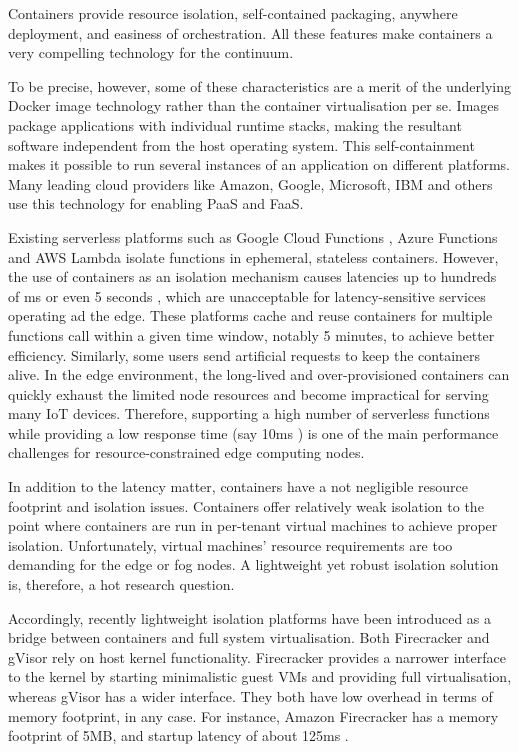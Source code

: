 Containers provide resource isolation, self-contained packaging, anywhere deployment, and easiness of orchestration. All these features make containers a very compelling technology for the continuum.

To be precise, however, some of these characteristics are a merit of the underlying Docker image technology \cite{docker-image} rather than the container virtualisation per se. Images package applications with individual runtime stacks, making the resultant software independent from the host operating system. This self-containment makes it possible to run several instances of an application on different platforms. Many leading cloud providers like Amazon, Google, Microsoft, IBM and others use this technology for enabling PaaS and FaaS.

Existing serverless platforms such as Google Cloud Functions \cite{gcloud-functions}, Azure Functions \cite{azure-functions} and AWS Lambda \cite{aws-lambda} isolate functions in ephemeral, stateless containers. However, the use of containers as an isolation mechanism causes latencies up to hundreds of ms or even 5 seconds \cite{mohanty2018evaluation}, which are unacceptable for latency-sensitive services operating ad the edge. These platforms cache and reuse containers for multiple functions call within a given time window, notably 5 minutes, to achieve better efficiency. Similarly, some users send artificial requests to keep the containers alive. In the edge environment, the long-lived and over-provisioned containers can quickly exhaust the limited node resources and become impractical for serving many IoT devices. Therefore, supporting a high number of serverless functions while providing a low response time (say 10ms \cite{elbamby2019wireless}) is one of the main performance challenges for resource-constrained edge computing nodes.

In addition to the latency matter, containers have a not negligible resource footprint and isolation issues. Containers offer relatively weak isolation to the point where containers are run in per-tenant virtual machines to achieve proper isolation. Unfortunately, virtual machines' resource requirements are too demanding for the edge or fog nodes. A lightweight yet robust isolation solution is, therefore, a hot research question.

Accordingly, recently lightweight isolation platforms have been introduced as a bridge between containers and full system virtualisation. Both Firecracker and gVisor \cite{caraza2020blending} rely on host kernel functionality. Firecracker provides a narrower interface to the kernel by starting minimalistic guest VMs and providing full virtualisation, whereas gVisor has a wider interface. They both have low overhead in terms of memory footprint, in any case. For instance, Amazon Firecracker has a memory footprint of 5MB, and startup latency of about 125ms \cite{firecracker}.

